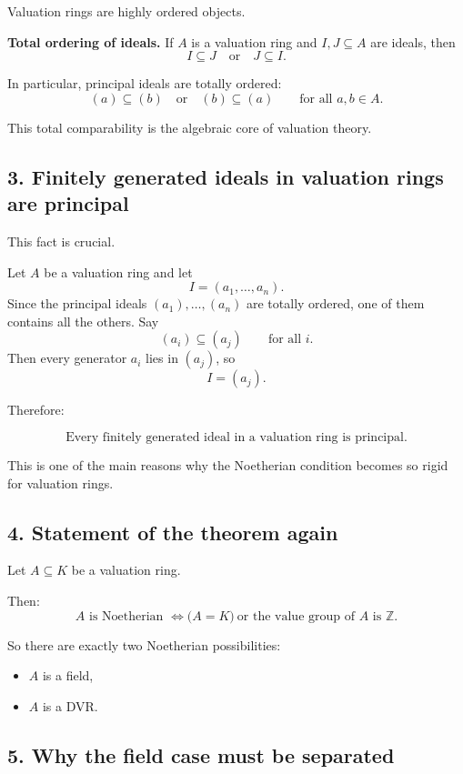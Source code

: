 \documentclass[12pt,a4paper]{article}
\theoremstyle{notespace}
\begin{document}
Valuation rings are highly ordered objects.

\textbf{Total ordering of ideals.}
If \(A\) is a valuation ring and \(I,J\subseteq A\) are ideals, then
\[
I\subseteq J
\quad \text{or} \quad
J\subseteq I.
\]

In particular, principal ideals are totally ordered:
\[
(a)\subseteq (b)
\quad \text{or} \quad
(b)\subseteq (a)
\qquad
\text{for all }a,b\in A.
\]

This total comparability is the algebraic core of valuation theory.

\subsection{3. Finitely generated ideals in valuation rings are principal}

This fact is crucial.

Let \(A\) be a valuation ring and let
\[
I=(a_1,\dots,a_n).
\]
Since the principal ideals \((a_1),\dots,(a_n)\) are totally ordered, one of them contains all the others. Say
\[
(a_i)\subseteq (a_j)
\qquad \text{for all }i.
\]
Then every generator \(a_i\) lies in \((a_j)\), so
\[
I=(a_j).
\]

Therefore:

\[
\boxed{\text{Every finitely generated ideal in a valuation ring is principal.}}
\]

This is one of the main reasons why the Noetherian condition becomes so rigid for valuation rings.

\subsection{4. Statement of the theorem again}

Let \(A\subseteq K\) be a valuation ring.

Then:
\[
A \text{ is Noetherian }
\iff
\bigl(A=K\bigr)\ \text{or the value group of }A\text{ is }\mathbb Z.
\]

So there are exactly two Noetherian possibilities:
\begin{itemize}
	\item \(A\) is a field,
	\item \(A\) is a DVR.
\end{itemize}

\subsection{5. Why the field case must be separated}
\end{document}
